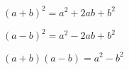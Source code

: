 \begin{tcolorbox}[title=Konjugat- och kvadreringsreglerna]
	$(a+b)^2=a^2+2ab+b^2$

	$(a-b)^2=a^2-2ab+b^2$

	$(a+b)(a-b)=a^2-b^2$
\end{tcolorbox}
